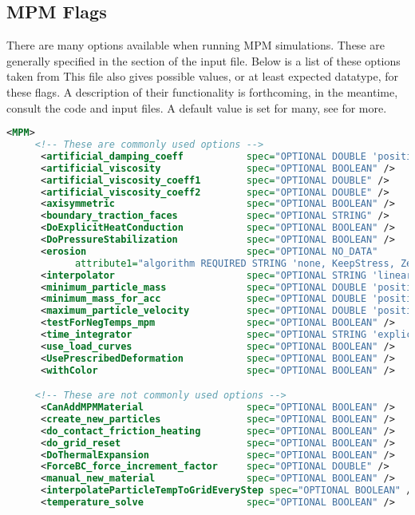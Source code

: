 \subsection{MPM Flags} \label{Sec:MPMFlags}

There are many options available when running MPM simulations.  These
are generally specified in the  section of the input file.
Below is a list of these options taken from
This file also gives possible values, or at least expected datatype,
for these flags.  A description of their functionality is forthcoming,
in the meantime, consult the code and input files.  A default value is
set for many, see  for more.

\begin{lstlisting}[language=XML]
    <MPM>
     <!-- These are commonly used options -->
      <artificial_damping_coeff           spec="OPTIONAL DOUBLE 'positive'"/>
      <artificial_viscosity               spec="OPTIONAL BOOLEAN" />
      <artificial_viscosity_coeff1        spec="OPTIONAL DOUBLE" />
      <artificial_viscosity_coeff2        spec="OPTIONAL DOUBLE" />
      <axisymmetric                       spec="OPTIONAL BOOLEAN" />
      <boundary_traction_faces            spec="OPTIONAL STRING" />
      <DoExplicitHeatConduction           spec="OPTIONAL BOOLEAN" />
      <DoPressureStabilization            spec="OPTIONAL BOOLEAN" />
      <erosion                            spec="OPTIONAL NO_DATA"
            attribute1="algorithm REQUIRED STRING 'none, KeepStress, ZeroStress, RemoveMass'" />
      <interpolator                       spec="OPTIONAL STRING 'linear, gimp, 3rdorderBS, 4thorderBS'" />
      <minimum_particle_mass              spec="OPTIONAL DOUBLE 'positive'"/>
      <minimum_mass_for_acc               spec="OPTIONAL DOUBLE 'positive'"/>
      <maximum_particle_velocity          spec="OPTIONAL DOUBLE 'positive'"/>
      <testForNegTemps_mpm                spec="OPTIONAL BOOLEAN" />
      <time_integrator                    spec="OPTIONAL STRING 'explicit, fracture, implicit'" />
      <use_load_curves                    spec="OPTIONAL BOOLEAN" />
      <UsePrescribedDeformation           spec="OPTIONAL BOOLEAN" />
      <withColor                          spec="OPTIONAL BOOLEAN" />

     <!-- These are not commonly used options -->
      <CanAddMPMMaterial                  spec="OPTIONAL BOOLEAN" />
      <create_new_particles               spec="OPTIONAL BOOLEAN" />
      <do_contact_friction_heating        spec="OPTIONAL BOOLEAN" />
      <do_grid_reset                      spec="OPTIONAL BOOLEAN" />
      <DoThermalExpansion                 spec="OPTIONAL BOOLEAN" />
      <ForceBC_force_increment_factor     spec="OPTIONAL DOUBLE" />
      <manual_new_material                spec="OPTIONAL BOOLEAN" />
      <interpolateParticleTempToGridEveryStep spec="OPTIONAL BOOLEAN" />
      <temperature_solve                  spec="OPTIONAL BOOLEAN" />


\end{lstlisting}
